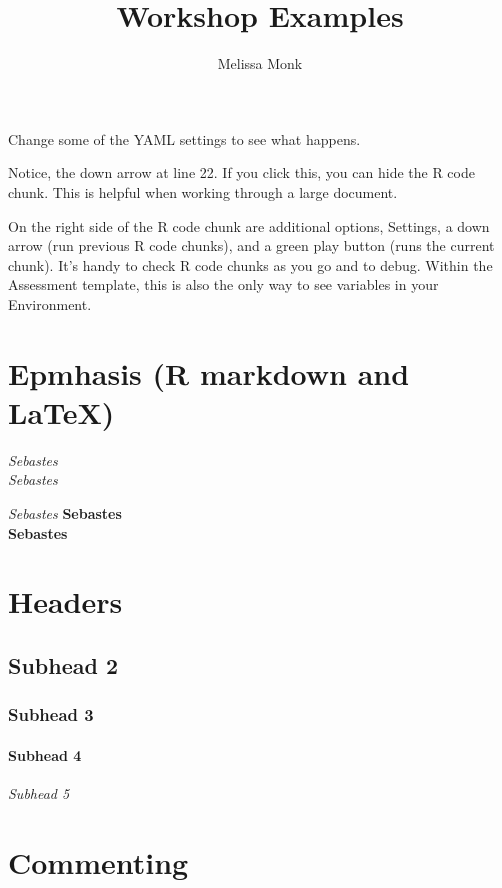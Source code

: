 \documentclass[12pt,]{article}
\title{Workshop Examples}
\author{Melissa Monk}
\date{}
\let\oldparagraph\paragraph
\renewcommand{\paragraph}[1]{\oldparagraph{#1}\mbox{}}
\begin{document}
\maketitle

{
\setcounter{tocdepth}{4}
\tableofcontents
}
Change some of the YAML settings to see what happens.

Notice, the down arrow at line 22. If you click this, you can hide the R
code chunk. This is helpful when working through a large document.

On the right side of the R code chunk are additional options, Settings,
a down arrow (run previous R code chunks), and a green play button (runs
the current chunk). It's handy to check R code chunks as you go and to
debug. Within the Assessment template, this is also the only way to see
variables in your Environment.

\section{Epmhasis (R markdown and
LaTeX)}\label{epmhasis-r-markdown-and-latex}

\emph{Sebastes}\\
\emph{Sebastes}

\emph{Sebastes} \textbf{Sebastes}\\
\textbf{Sebastes}

\section{Headers}\label{headers}

\subsection{Subhead 2}\label{subhead-2}

\subsubsection*{Subhead 3}\label{subhead-3}

\paragraph{Subhead 4}\label{subhead-4}

\emph{Subhead 5}

\section{Commenting}\label{commenting}
\end{document}
